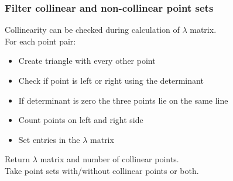\begin{frame}
\frametitle{Filter collinear and non-collinear point sets}
Collinearity can be checked during calculation of $\lambda$ matrix. \\
For each point pair:
\begin{itemize}
  \item Create triangle with every other point
  \item Check if point is left or right using the determinant
  \item If determinant is zero the three points lie on the same line
  \item Count points on left and right side
  \item Set entries in the $\lambda$ matrix
\end{itemize}
Return $\lambda$ matrix and number of collinear points. \\
Take point sets with/without collinear points or both.
\end{frame}
